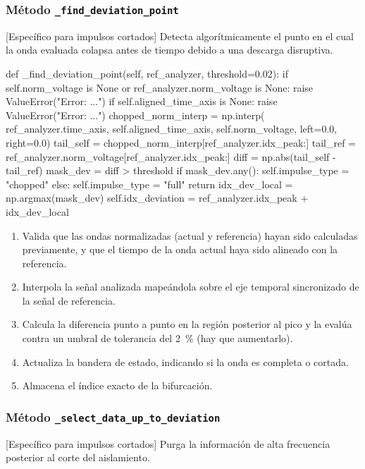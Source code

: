 \subsubsection{Método \texttt{\_find\_deviation\_point}}
[Específico para impulsos cortados] Detecta algorítmicamente el punto en el cual la onda evaluada colapsa antes de tiempo debido a una descarga disruptiva.

\begin{python}
def _find_deviation_point(self, ref_analyzer, threshold=0.02):
    if self.norm_voltage is None or ref_analyzer.norm_voltage is None:
        raise ValueError("Error: ...")
    if self.aligned_time_axis is None:
        raise ValueError("Error: ...")
    chopped_norm_interp = np.interp(
        ref_analyzer.time_axis,
        self.aligned_time_axis,
        self.norm_voltage,
        left=0.0, right=0.0)
    tail_self = chopped_norm_interp[ref_analyzer.idx_peak:]
    tail_ref = ref_analyzer.norm_voltage[ref_analyzer.idx_peak:]
    diff = np.abs(tail_self - tail_ref)
    mask_dev = diff > threshold
    if mask_dev.any():
        self.impulse_type = "chopped"
    else:
        self.impulse_type = "full"
        return
    idx_dev_local = np.argmax(mask_dev)
    self.idx_deviation = ref_analyzer.idx_peak + idx_dev_local
\end{python}

\begin{enumerate}
    \item Valida que las ondas normalizadas (actual y referencia) hayan sido calculadas previamente, y que el tiempo de la onda actual haya sido alineado con la referencia.
    \item Interpola la señal analizada mapeándola sobre el eje temporal sincronizado de la señal de referencia.
    \item Calcula la diferencia punto a punto en la región posterior al pico y la evalúa contra un umbral de tolerancia del \SI{2}{\percent} (hay que aumentarlo).
    \item Actualiza la bandera de estado, indicando si la onda es completa o cortada.
    \item Almacena el índice exacto de la bifurcación.
\end{enumerate}

\subsubsection{Método \texttt{\_select\_data\_up\_to\_deviation}}
[Específico para impulsos cortados] Purga la información de alta frecuencia posterior al corte del aislamiento.

